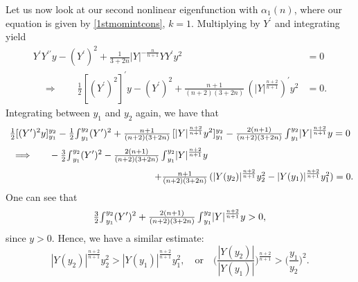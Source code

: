 \documentclass[12pt]{amsart}
\begin{document}
 

Let us now look at our second nonlinear eigenfunction with
$\alpha_1(n)$, where our equation is given by
\eqref{1stmomintcons}, $k=1$. Multiplying by $Y^\prime$ and
integrating yield
\begin{equation*}
\begin{split}
\mbox{$Y^\prime Y^{\prime\prime}y - (Y^\prime)^2 +\frac{1}{3+2n}
|Y|^{-\frac{n}{n+1}}YY^\prime y^2$}& = 0\\[1mm] {\quad \Longrightarrow \quad}
  \quad
\mbox{$\frac{1}{2}[(Y^\prime)^2]^\prime y - (Y^\prime)^2 +
\frac{n+1}{(n+2)(3+2n)}\,(|Y|^{\frac{n+2}{n+1}})^\prime y^2$}& =
0.
\end{split}
\end{equation*}
Integrating between $y_1$ and $y_2$ again, we have that
\begin{equation*}
 
\mbox{$\frac{1}{2}$}[(Y^\prime)^2y]_{y_1}^{y_2} -
\mbox{$\frac{1}{2}$}\mbox{$ \int $}_{y_1}^{y_2} (Y^\prime)^2
+\mbox{$\frac{n+1}{(n+2)(3+2n)}$}\,[|Y|^{\frac{n+2}{n+1}}y^2]_{y_1}^{y_2}
-\mbox{$\frac{2(n+1)}{(n+2)(3+2n)}$}\, \mbox{$ \int $}_{y_1}^{y_2}
|Y|^{\frac{n+2}{n+1}}y=0
 \end{equation*}
 \begin{equation*}
 \begin{split}
 {\quad \Longrightarrow \quad} \quad
-\mbox{$\frac{3}{2}$}\mbox{$ \int $}_{y_1}^{y_2} (Y^\prime)^2 -
\mbox{$\frac{2(n+1)}{(n+2)(3+2n)}$}\, \mbox{$ \int $}_{y_1}^{y_2}
|Y|^{\frac{n+2}{n+1}}y&\\[1mm]
+\mbox{$\frac{n+1}{(n+2)(3+2n)}$}&\,\mbox{$(|Y(y_2)|^\frac{n+2}{n+1}y_2^2-|Y(y_1)|^\frac{n+2}{n+1}y_1^2)$}=0.
\end{split}
\end{equation*}
One can see that
\begin{equation*}
\mbox{$\frac{3}{2}$}\mbox{$ \int $}_{y_1}^{y_2}
(Y^\prime)^2+\mbox{$\frac{2(n+1)}{(n+2)(3+2n)}$}\, \mbox{$ \int
$}_{y_1}^{y_2} |Y|^{\frac{n+2}{n+1}}y>0,
\end{equation*}
since $y>0$. Hence, we have  a similar estimate:
\begin{equation}
 \label{N12}
|Y(y_2)|^\frac{n+2}{n+1}y_2^2>|Y(y_1)|^\frac{n+2}{n+1}y_1^2,
\quad \mbox{or} \quad
\mbox{$\big(\frac{|Y(y_2)|}{|Y(y_1)|}\big)^{\frac{n+2}{n+1}}>\big(\frac{y_1}{y_2}\big)^2$}.
\end{equation}
\end{document}
